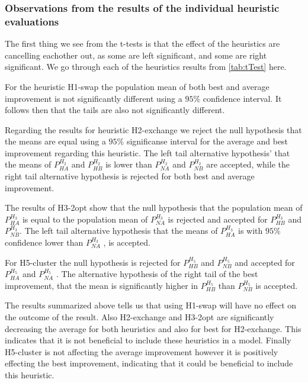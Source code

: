 \documentclass[../main.tex]{subfiles}
\begin{document}
\subsubsection{Observations from the results of the individual heuristic evaluations}
The first thing we see from the t-tests is that the effect of the heuristics are cancelling eachother out, as some are left significant, and some are right significant.
We go through each of the heuristics results from \cref{tab:tTest} here. \par
For the heuristic H1-swap the population mean of both best and average improvement is not significantly different using a $95\%$ confidence interval. It follows then that the tails are also not significantly different. \par
Regarding the results for heuristic H2-exchange we reject the null hypothesis that the means are equal using a $95\%$ significanse interval for the average and best improvement regarding this heuristic. 
The left tail alternative hypothesis' that the means of $P^{H_2}_{HA}$ and $P^{H_2}_{HB}$ is lower than $P^{H_2}_{NA}$ and $P^{H_2}_{NB}$ are accepted, while the right tail alternative hypothesis is rejected for both best and average improvement.\par 
The results of H3-2opt show that the null hypothesis that the population mean of $P^{H_3}_{HA}$ is equal to the population mean of $P^{H_3}_{NA}$ is rejected and accepted for $P^{H_3}_{HB}$ and $P^{H_3}_{NB}$. The left tail alternative hypothesis that the means of $P^{H_3}_{HA}$ is with $95\%$ confidence lower than $P^{H_3}_{NA}$ , is accepted.\par 
For H5-cluster the null hypothesis is rejected for  $P^{H_5}_{HB}$ and  $P^{H_5}_{NB}$ and accepted for $P^{H_5}_{HA}$ and $P^{H_5}_{NA}$ . 
The alternative hypothesis of the right tail of the best improvement, that the mean is significantly higher in $P^{H_5}_{HB}$ than  $P^{H_5}_{NB}$ is accepted.

The results summarized above tells us that using H1-swap will have no effect on the outcome of the result. 
Also H2-exchange and H3-2opt are significantly decreasing the average for both heuristics and also for best for H2-exchange. 
This indicates that it is not beneficial to include these heuristics in a model.
Finally H5-cluster is not affecting the average improvement however it is positively effecting the best improvement, indicating that it could be beneficial to include this heuristic.
\end{document}
